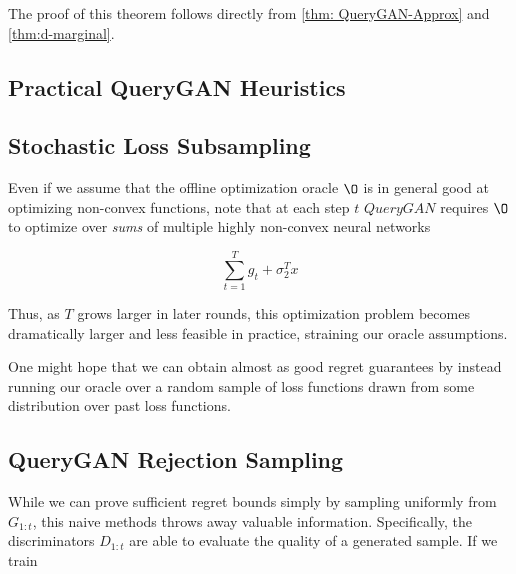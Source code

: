 \documentclass[]{article}
\theoremstyle{definition}
\begin{document}
The proof of this theorem follows directly from \autoref{thm: QueryGAN-Approx} and \autoref{thm:d-marginal}.





\subsection{Practical QueryGAN Heuristics}

\subsection{Stochastic Loss Subsampling}
    Even if we assume that the offline optimization oracle $\O$ is in general good at optimizing non-convex functions, note that at each step $t$ $QueryGAN$ requires $\O$ to optimize over \emph{sums} of multiple highly non-convex neural networks

    \begin{equation}
        \sum_{t=1}^T g_t + \sigma_2^Tx 
    \end{equation}

    Thus, as $T$ grows larger in later rounds, this optimization problem becomes dramatically larger and less feasible in practice, straining our oracle assumptions. 

    One might hope that we can obtain almost as good regret guarantees by instead running our oracle over a random sample of loss functions drawn from some distribution over past loss functions. 


\subsection{QueryGAN Rejection Sampling}
While we can prove sufficient regret bounds simply by sampling uniformly from $G_{1:t}$, this naive methods throws away valuable information. Specifically, the discriminators $D_{1:t}$ are able to evaluate the quality of a generated sample. If we train 
\end{document}
